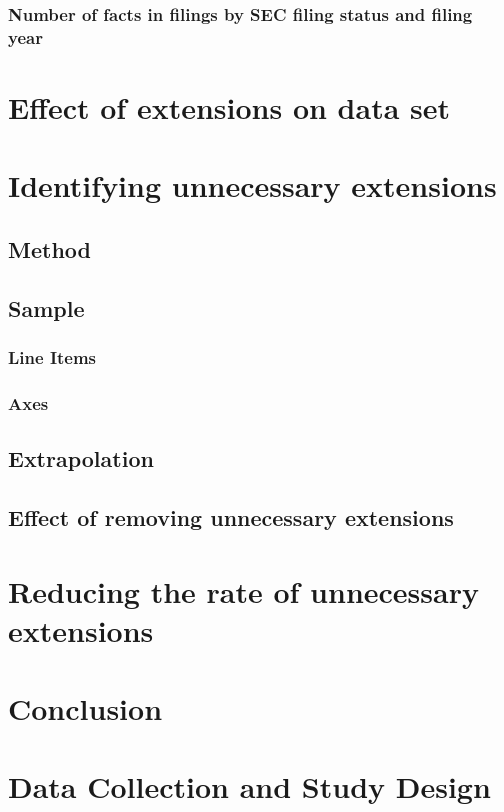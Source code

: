 \documentclass{article}
\begin{document}
\subsubsection{Number of facts in filings by SEC filing status and filing year}

\section{Effect of extensions on data set}

\section{Identifying unnecessary extensions}
\subsection{Method}

\subsection{Sample}
\subsubsection{Line Items}
\subsubsection{Axes}

\subsection{Extrapolation}
\subsection{Effect of removing unnecessary extensions}

\section{Reducing the rate of unnecessary extensions}

\section{Conclusion}








\section{Data Collection and Study Design}
\end{document}
